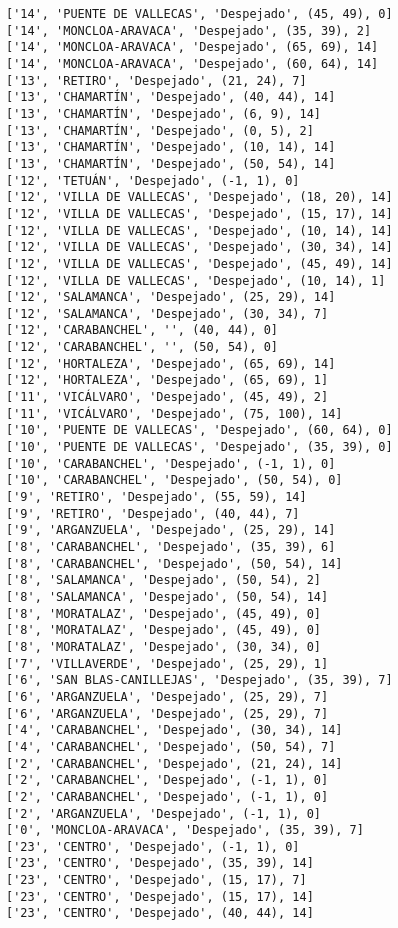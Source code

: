 \documentclass[11pt]{article}
\begin{document}
\begin{Verbatim}[commandchars=\\\{\}]
['14', 'PUENTE DE VALLECAS', 'Despejado', (45, 49), 0]
['14', 'MONCLOA-ARAVACA', 'Despejado', (35, 39), 2]
['14', 'MONCLOA-ARAVACA', 'Despejado', (65, 69), 14]
['14', 'MONCLOA-ARAVACA', 'Despejado', (60, 64), 14]
['13', 'RETIRO', 'Despejado', (21, 24), 7]
['13', 'CHAMARTÍN', 'Despejado', (40, 44), 14]
['13', 'CHAMARTÍN', 'Despejado', (6, 9), 14]
['13', 'CHAMARTÍN', 'Despejado', (0, 5), 2]
['13', 'CHAMARTÍN', 'Despejado', (10, 14), 14]
['13', 'CHAMARTÍN', 'Despejado', (50, 54), 14]
['12', 'TETUÁN', 'Despejado', (-1, 1), 0]
['12', 'VILLA DE VALLECAS', 'Despejado', (18, 20), 14]
['12', 'VILLA DE VALLECAS', 'Despejado', (15, 17), 14]
['12', 'VILLA DE VALLECAS', 'Despejado', (10, 14), 14]
['12', 'VILLA DE VALLECAS', 'Despejado', (30, 34), 14]
['12', 'VILLA DE VALLECAS', 'Despejado', (45, 49), 14]
['12', 'VILLA DE VALLECAS', 'Despejado', (10, 14), 1]
['12', 'SALAMANCA', 'Despejado', (25, 29), 14]
['12', 'SALAMANCA', 'Despejado', (30, 34), 7]
['12', 'CARABANCHEL', '', (40, 44), 0]
['12', 'CARABANCHEL', '', (50, 54), 0]
['12', 'HORTALEZA', 'Despejado', (65, 69), 14]
['12', 'HORTALEZA', 'Despejado', (65, 69), 1]
['11', 'VICÁLVARO', 'Despejado', (45, 49), 2]
['11', 'VICÁLVARO', 'Despejado', (75, 100), 14]
['10', 'PUENTE DE VALLECAS', 'Despejado', (60, 64), 0]
['10', 'PUENTE DE VALLECAS', 'Despejado', (35, 39), 0]
['10', 'CARABANCHEL', 'Despejado', (-1, 1), 0]
['10', 'CARABANCHEL', 'Despejado', (50, 54), 0]
['9', 'RETIRO', 'Despejado', (55, 59), 14]
['9', 'RETIRO', 'Despejado', (40, 44), 7]
['9', 'ARGANZUELA', 'Despejado', (25, 29), 14]
['8', 'CARABANCHEL', 'Despejado', (35, 39), 6]
['8', 'CARABANCHEL', 'Despejado', (50, 54), 14]
['8', 'SALAMANCA', 'Despejado', (50, 54), 2]
['8', 'SALAMANCA', 'Despejado', (50, 54), 14]
['8', 'MORATALAZ', 'Despejado', (45, 49), 0]
['8', 'MORATALAZ', 'Despejado', (45, 49), 0]
['8', 'MORATALAZ', 'Despejado', (30, 34), 0]
['7', 'VILLAVERDE', 'Despejado', (25, 29), 1]
['6', 'SAN BLAS-CANILLEJAS', 'Despejado', (35, 39), 7]
['6', 'ARGANZUELA', 'Despejado', (25, 29), 7]
['6', 'ARGANZUELA', 'Despejado', (25, 29), 7]
['4', 'CARABANCHEL', 'Despejado', (30, 34), 14]
['4', 'CARABANCHEL', 'Despejado', (50, 54), 7]
['2', 'CARABANCHEL', 'Despejado', (21, 24), 14]
['2', 'CARABANCHEL', 'Despejado', (-1, 1), 0]
['2', 'CARABANCHEL', 'Despejado', (-1, 1), 0]
['2', 'ARGANZUELA', 'Despejado', (-1, 1), 0]
['0', 'MONCLOA-ARAVACA', 'Despejado', (35, 39), 7]
['23', 'CENTRO', 'Despejado', (-1, 1), 0]
['23', 'CENTRO', 'Despejado', (35, 39), 14]
['23', 'CENTRO', 'Despejado', (15, 17), 7]
['23', 'CENTRO', 'Despejado', (15, 17), 14]
['23', 'CENTRO', 'Despejado', (40, 44), 14]

\end{Verbatim}
\end{document}
